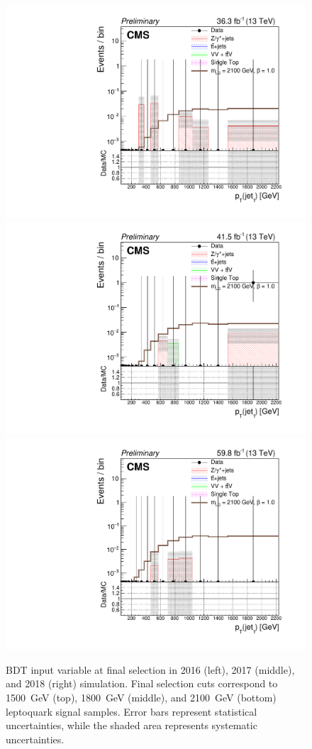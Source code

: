 \begin{figure}[H]
    {\includegraphics[width=.32\textwidth]{Images/Analysis/Results_2016_Unblinded/Plots/Final_selection/BasicLQ_uujj_Pt_jet1_final2100.pdf}}
    {\includegraphics[width=.32\textwidth]{Images/Analysis/Results_2017_Unblinded/Plots/Final_selection/BasicLQ_uujj_Pt_jet1_final2100.pdf}}
    {\includegraphics[width=.32\textwidth]{Images/Analysis/Results_2018_Unblinded/Plots/Final_selection/BasicLQ_uujj_Pt_jet1_final2100.pdf}}
    \caption{BDT input variable \ptof{\jetOne} at final selection in 2016 (left), 2017 (middle), and 2018 (right) simulation. Final selection cuts correspond to \SI{1500}{GeV} (top), \SI{1800}{GeV} (middle), and \SI{2100}{GeV} (bottom) leptoquark signal samples. Error bars represent statistical uncertainties, while the shaded area represents systematic uncertainties.
    \label{figapp:finalSelptj1}}
\end{figure}
